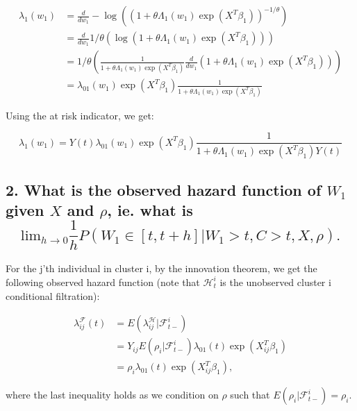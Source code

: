 \documentclass[
  11pt,
]{article}
\begin{document}
\begin{align*}
\lambda_1(w_1) &= \frac{d}{d w_1} -\log((1+\theta \Lambda_1(w_1) \exp(X^T\beta_1))^{-1/\theta}) \\
&=\frac{d}{d w_1} 1/\theta (\log(1+\theta \Lambda_1(w_1) \exp(X^T\beta_1)) )\\
&=1/\theta (\frac{1}{1+\theta \Lambda_1(w_1) \exp(X^T\beta_1)} \frac{d}{d w_1}(1+\theta \Lambda_1(w_1) \exp(X^T\beta_1))) \\
&=\lambda_{01} (w_1) \exp(X^T\beta_1) \frac{1}{1+\theta \Lambda_1(w_1) \exp(X^T\beta_1)}
\end{align*}

Using the at risk indicator, we get:

\[
\lambda_1(w_1) = Y(t) \lambda_{01} (w_1) \exp(X^T\beta_1) \frac{1}{1+\theta \Lambda_1(w_1) \exp(X^T\beta_1) Y(t)}
\]

\hypertarget{what-is-the-observed-hazard-function-of-w_1-given-x-and-rho-ie.-what-is-textlim_h-rightarrow-0-frac1h-pw_1-in-tthw_1t-ct-x-rho.}{%
\subsection{\texorpdfstring{2. What is the observed hazard function of
\(W_1\) given \(X\) and \(\rho\), ie. what is
\[\text{lim}_{h \rightarrow 0} \frac{1}{h} P(W_1 \in [t,t+h]|W_1>t, C>t, X, \rho).\]}{2. What is the observed hazard function of W\_1 given X and \textbackslash rho, ie. what is \textbackslash text\{lim\}\_\{h \textbackslash rightarrow 0\} \textbackslash frac\{1\}\{h\} P(W\_1 \textbackslash in {[}t,t+h{]}\textbar W\_1\textgreater t, C\textgreater t, X, \textbackslash rho).}}\label{what-is-the-observed-hazard-function-of-w_1-given-x-and-rho-ie.-what-is-textlim_h-rightarrow-0-frac1h-pw_1-in-tthw_1t-ct-x-rho.}}

For the j'th individual in cluster i, by the innovation theorem, we get
the following observed hazard function (note that \(\mathcal{H}^i_t\) is
the unobserved cluster i conditional filtration):

\begin{align*}
\lambda_{ij}^{\mathcal{F}}(t) &= E(\lambda_{ij}^{\mathcal{H}} | \mathcal{F}^i_{t-} ) \\
&=Y_{ij} E(\rho_i|\mathcal{F}^i_{t-}) \lambda_{01}(t) \exp(X_{ij}^T\beta_1) \\
&= \rho_i \lambda_{01}(t) \exp(X_{ij}^T\beta_1),
\end{align*}

where the last inequality holds as we condition on \(\rho\) such that
\(E(\rho_i|\mathcal{F}^i_{t-})=\rho_i\).
\end{document}
